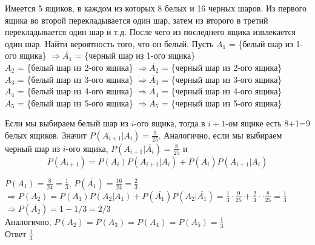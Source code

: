 \begin{exercise}[5] Имеется  5 ящиков, в каждом из которых   8  белых  и  16  черных шаров. Из первого ящика во второй перекладывается один шар, затем из второго в третий перекладывается один шар  и т.д. После чего из последнего ящика извлекается один шар. Найти вероятность того, что он белый.
	Пусть $A_1$ = \{белый шар из 1-ого ящика\} $\Rightarrow \overline{A_1}$ = \{черный шар из 1-ого ящика\} \\ $A_2$ = \{белый шар из 2-ого ящика\} $\Rightarrow \overline{A_2}$ = \{черный шар из 2-ого ящика\} \\ $A_3$ = \{белый шар из 3-ого ящика\} $\Rightarrow \overline{A_3}$ = \{черный шар из 3-ого ящика\} \\ $A_4$ = \{белый шар из 4-ого ящика\} $\Rightarrow \overline{A_4}$ = \{черный шар из 4-ого ящика\} \\ $A_5$ = \{белый шар из 5-ого ящика\} $\Rightarrow \overline{A_5}$ = \{черный шар из 5-ого ящика\}
	
	Если мы выбираем белый шар из $i$-ого ящика, тогда в $i+1$-ом ящике есть 8+1=9 белых ящиков. Значит $P(A_{i+1} | A_i) = \frac{9}{25}$. Аналогично, если мы выбираем черный шар из $i$-ого ящика, $P(A_{i+1} | \overline{A_i}) = \frac{8}{25}$ и $$P(A_{i+1}) = P(A_i) P(A_{i+1} | A_i) + P(\overline{A_i}) P(A_{i+1} | \overline{A_i})$$ 
	
	$P(A_1) = \frac{8}{24} = \frac{1}{3}$, $P(\overline{A_1}) = \frac{16}{24} = \frac{2}{3}$ \\ $\Rightarrow P(A_2) = P(A_1) P(A_2 | A_1) + P(\overline{A_1}) P(A_2 | \overline{A_1}) = \frac{1}{3} \cdot \frac{9}{25} + \frac{2}{3} \cdot \cdot \frac{8}{25} = \frac{1}{3}$ \\ $\Rightarrow P(\overline{A_2}) = 1-1/3=2/3$ \\ Аналогично, $P(A_2) = P(A_3) = P(A_4) = P(A_5) = \frac{1}{3}$ \\ Ответ $\frac{1}{3}$
\end{exercise}